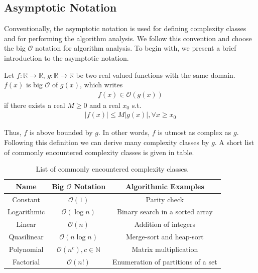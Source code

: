 \subsection{Asymptotic Notation}
Conventionally, the asymptotic notation is used for defining complexity classes and for performing the algorithm analysis. 
We follow this convention and choose the big $\mathcal{O}$ notation for algorithm analysis. To begin with, we present a brief
introduction to the asymptotic notation.
\begin{definition}
    Let $f: \mathbb{R} \rightarrow \mathbb{R}$, $g: \mathbb{R} \rightarrow \mathbb{R}$ be two real valued functions with the same domain. 
    $f(x)$ is big $\mathcal{O}$ of $g(x)$, which writes
    \begin{align*}
        f(x) \in \mathcal{O}(g(x))
    \end{align*}
    if there exists a real $M \geq 0$ and a real $x_0$ s.t. 
    \begin{align*}
        |f(x)| \leq M |g(x)|, \forall x \geq x_0
    \end{align*}
\end{definition}
Thus, $f$ is above bounded by $g$. In other words, $f$ is utmost as complex as $g$. Following this definition 
we can derive many complexity classes by $g$. A short list of commonly encountered complexity classes is given 
in table.
\begin{table}[H]
    \centering 
    \begin{tabular}{|| c | c | c ||}
        \hline 
        Name & Big $\mathcal{O}$ Notation & Algorithmic Examples \\ 
        \hline 
        Constant & $\mathcal{O}(1)$ & Parity check\\
        \hline 
        Logarithmic & $\mathcal{O}(\log n)$ & Binary search in a sorted array \\ 
        \hline 
        Linear & $\mathcal{O}(n)$ & Addition of integers \\
        \hline 
        Quasilinear & $\mathcal{O}(n\log n)$ & Merge-sort and heap-sort \\
        \hline 
        Polynomial & $\mathcal{O} (n^c), c \in \mathbb{N}$ & Matrix multiplication \\
        \hline 
        Factorial & $\mathcal{O} (n!)$ & Enumeration of partitions of a set\\
        \hline 
    \end{tabular}
    \caption{List of commonly encountered complexity classes.}
\end{table}

